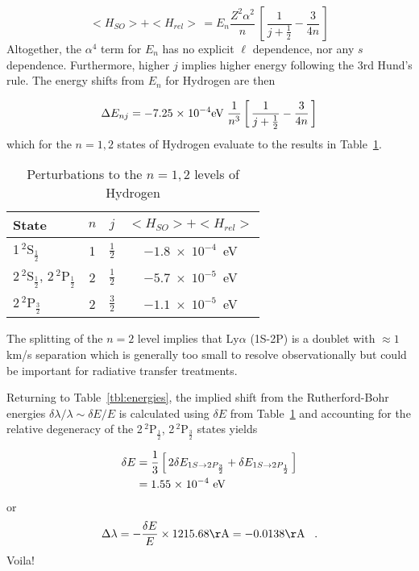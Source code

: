 \documentclass[graybox]{svmult}
\def\ohf{\frac{1}{2}}
\def\ltk{\left [ \,}
\def\rtk{\, \right  ] }
\def\sci#1{{\; \times \; 10^{#1}}}
\def\rhf{\frac{3}{2}}
\def\perd{\;\;\; .}
\begin{document}
\begin{equation}
<H_{SO}> + <H_{rel}> \, = E_n \frac{Z^2 \alpha^2}{n} \, 
\ltk \frac{1}{j+\ohf} - \frac{3}{4n} \rtk
\end{equation}
Altogether, the $\alpha^4$ term for $E_n$ has
no explicit $\ell$ dependence, nor any $s$ dependence.
Furthermore, higher $j$ implies higher energy 
following the 3rd Hund's rule.
The energy shifts from $E_n$ for Hydrogen are then

\begin{equation}
\Delta E_{nj} = -7.25 \sci{-4} {\rm eV} \; \frac{1}{n^3} 
   \ltk \frac{1}{j+\ohf} - \frac{3}{4n} \rtk
\end{equation}
which for the $n=1,2$ states of Hydrogen evaluate to
the results in Table~\ref{tab:Enshift}.

\begin{table}
\caption{Perturbations to the $n=1,2$ levels of Hydrogen
\label{tab:Enshift}}
\begin{center}
\begin{tabular}{lccc}
\hline
State & $n$ & $j$ & $<H_{SO}> + <H_{rel}>$ \\
\hline
1\,$^2$S$_{\ohf}$ & 1 & $\ohf$ & $-1.8 \sci{-4}$~eV \\
2\,$^2$S$_{\ohf}$, 2\,$^2$P$_\ohf$ & 2 & $\ohf$ & $-5.7 \sci{-5}$~eV \\
2\,$^2$P$_\rhf$ & 2 & $\rhf$ & $-1.1 \sci{-5}$~eV \\
\hline
\end{tabular}
\end{center}
\end{table}

The splitting of the $n=2$ level implies that
Ly$\alpha$ (1S-2P) is a doublet with $\approx 1$km/s separation
which is generally too small to resolve observationally
but could be important for radiative transfer treatments.

Returning to Table~\ref{tbl:energies}, the implied
shift from the Rutherford-Bohr energies
$\delta\lambda/\lambda \sim \delta E/E$
is calculated using $\delta E$ from Table~\ref{tab:Enshift}
and accounting for the relative degeneracy of the 
2\,$^2$P$_\ohf$, 2\,$^2$P$_\rhf$ states
yields

\begin{align}
\delta E &= \frac{1}{3} \ltk 2\delta E_{1S \to 2P_\rhf} + \delta E_{1S \to 2P_\ohf}
   \rtk \\
         &= 1.55 \sci{-4}~{\rm eV}
\end{align}
or
\begin{equation}
\Delta \lambda = -\frac{\delta E}{E} \times 1215.68 {\rm \AA} = -0.0138 {\rm \AA} \perd
\end{equation}
Voila!
\end{document}
